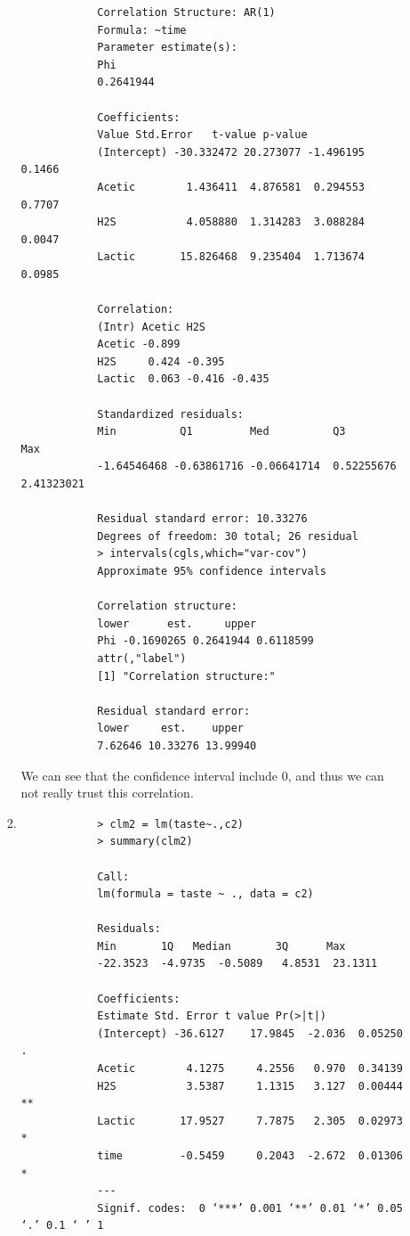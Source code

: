\documentclass[11pt]{article}
\begin{document}
\begin{enumerate}
\begin{enumerate}
\begin{enumerate}
\begin{verbatim}
			Correlation Structure: AR(1)
			Formula: ~time 
			Parameter estimate(s):
			Phi 
			0.2641944 
			
			Coefficients:
			Value Std.Error   t-value p-value
			(Intercept) -30.332472 20.273077 -1.496195  0.1466
			Acetic        1.436411  4.876581  0.294553  0.7707
			H2S           4.058880  1.314283  3.088284  0.0047
			Lactic       15.826468  9.235404  1.713674  0.0985
			
			Correlation: 
			(Intr) Acetic H2S   
			Acetic -0.899              
			H2S     0.424 -0.395       
			Lactic  0.063 -0.416 -0.435
			
			Standardized residuals:
			Min          Q1         Med          Q3         Max 
			-1.64546468 -0.63861716 -0.06641714  0.52255676  2.41323021 
			
			Residual standard error: 10.33276 
			Degrees of freedom: 30 total; 26 residual
			> intervals(cgls,which="var-cov")
			Approximate 95% confidence intervals
			
			Correlation structure:
			lower      est.     upper
			Phi -0.1690265 0.2641944 0.6118599
			attr(,"label")
			[1] "Correlation structure:"
			
			Residual standard error:
			lower     est.    upper 
			7.62646 10.33276 13.99940 
		\end{verbatim}
		We can see that the confidence interval include 0, and thus we can not really trust this correlation.
		\item 
		\begin{verbatim}
			> clm2 = lm(taste~.,c2)
			> summary(clm2)
			
			Call:
			lm(formula = taste ~ ., data = c2)
			
			Residuals:
			Min       1Q   Median       3Q      Max 
			-22.3523  -4.9735  -0.5089   4.8531  23.1311 
			
			Coefficients:
			Estimate Std. Error t value Pr(>|t|)   
			(Intercept) -36.6127    17.9845  -2.036  0.05250 . 
			Acetic        4.1275     4.2556   0.970  0.34139   
			H2S           3.5387     1.1315   3.127  0.00444 **
			Lactic       17.9527     7.7875   2.305  0.02973 * 
			time         -0.5459     0.2043  -2.672  0.01306 * 
			---
			Signif. codes:  0 ‘***’ 0.001 ‘**’ 0.01 ‘*’ 0.05 ‘.’ 0.1 ‘ ’ 1
			

\end{verbatim}
\end{enumerate}
\end{enumerate}
\end{enumerate}
\end{document}
